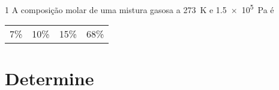 \documentclass[\mainfilename]{subfiles}
\begin{document}
\begin{exampleBox}1{ %
    A composição molar de uma mistura gasosa a \qty*{273}{\kelvin} e \qty*{1.5e5}{\pascal} é
} %
    \begin{center}
        \vspace{1ex}
        \begin{tabular}{*{4}{C}}
            \toprule
            
                & 
                & 
                & 
            
            \\\midrule
            
                7\%
                & 10\%
                & 15\%
                & 68\%
            
            \\\bottomrule
        \end{tabular}
        \vspace{-4ex}
    \end{center}

    \section*{Determine}


\end{exampleBox}
\end{document}
